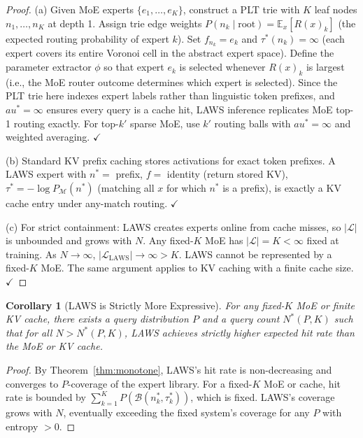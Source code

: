 \documentclass[11pt]{article}
\newtheorem{corollary}{Corollary}
\begin{document}
\begin{proof}
(a) Given MoE experts $\{e_1,\ldots,e_K\}$, construct a PLT trie with $K$ leaf
nodes $n_1,\ldots,n_K$ at depth 1.  Assign trie edge weights
$P(n_k \mid \text{root}) = \mathbb{E}_x[R(x)_k]$ (the expected routing
probability of expert $k$).  Set $f_{n_k} = e_k$ and $\tau^*(n_k) = \infty$
(each expert covers its entire Voronoi cell in the abstract expert space).
Define the parameter extractor $\phi$ so that expert $e_k$ is selected
whenever $R(x)_k$ is largest (i.e., the MoE router outcome determines which
expert is selected).  Since the PLT trie here indexes expert labels rather than
linguistic token prefixes, and $	au^* = \infty$ ensures every query is a cache
hit, LAWS inference replicates MoE top-1 routing exactly.  For top-$k'$ sparse
MoE, use $k'$ routing balls with $	au^* = \infty$ and weighted averaging.
$\checkmark$

(b) Standard KV prefix caching stores activations for exact token prefixes.
A LAWS expert with $n^* = $ prefix, $f = $ identity (return stored KV),
$\tau^* = -\log P_{\mathcal{M}}(n^*)$ (matching all $x$ for which $n^*$ is a prefix), is exactly a KV cache entry under any-match routing. $\checkmark$

(c) For strict containment: LAWS creates experts online from cache misses,
so $|\mathcal{L}|$ is unbounded and grows with $N$.  Any fixed-$K$ MoE has
$|\mathcal{L}| = K < \infty$ fixed at training.  As $N \to \infty$,
$|\mathcal{L}_{\mathrm{LAWS}}| \to \infty > K$.  LAWS cannot be represented
by a fixed-$K$ MoE.  The same argument applies to KV caching with a finite
cache size. $\checkmark$
\end{proof}

\begin{corollary}[LAWS is Strictly More Expressive]
For any fixed-$K$ MoE or finite KV cache, there exists a query distribution
$P$ and a query count $N^*(P, K)$ such that for all $N > N^*(P, K)$, LAWS
achieves strictly higher expected hit rate than the MoE or KV cache.
\end{corollary}

\begin{proof}
By Theorem~\ref{thm:monotone}, LAWS's hit rate is non-decreasing and converges
to $P$-coverage of the expert library.  For a fixed-$K$ MoE or cache, hit rate
is bounded by $\sum_{k=1}^K P(\mathcal{B}(n^*_k, \tau^*_k))$, which is fixed.
LAWS's coverage grows with $N$, eventually exceeding the fixed system's coverage
for any $P$ with entropy $> 0$.
\end{proof}
\end{document}
